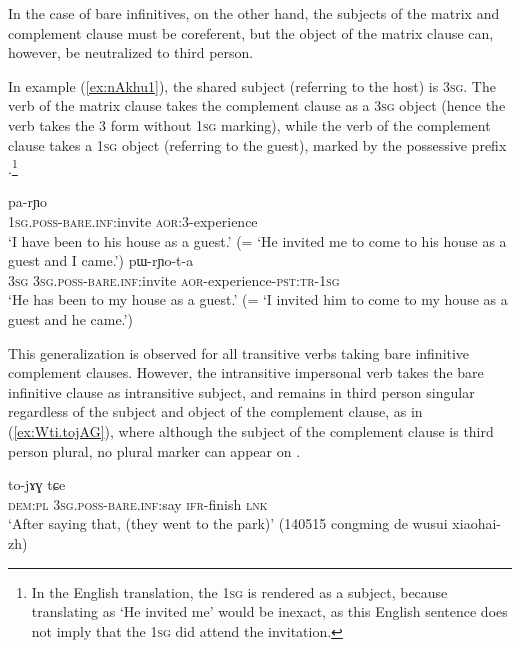 In the case of bare infinitives, on the other hand, the subjects of the matrix and complement clause must be coreferent, but the object of the matrix clause can, however, be neutralized to third person.

In example (\ref{ex:nAkhu1}), the shared subject (referring to the host) is \textsc{3sg}. The verb of the matrix clause takes the complement clause as a \textsc{3sg} object (hence the verb takes the 3\flobv{} form without \textsc{1sg} marking), while the verb of the complement clause takes a \textsc{1sg} object (referring to the guest), marked by the possessive prefix .\footnote{In the English translation, the \textsc{1sg} is rendered as a subject, because translating   as `He invited me' would be inexact, as this English sentence does not imply that the \textsc{1sg} did attend the invitation. }

\begin{exe}
\ex  \label{ex:nAkhu1}
\gll [a-nɤkʰu] pa-rɲo \\
\textsc{1sg}.\textsc{poss}-\textsc{bare}.\textsc{inf:}invite \textsc{aor}:3\flobv{}-experience \\
\glt `I have been to his house as a guest.' (= `He invited me to come to his house as a guest and I came.')
\ex  \label{ex:nAkhu2}
 pɯ-rɲo-t-a  \\
\textsc{3sg}  \textsc{3sg}.\textsc{poss}-\textsc{bare}.\textsc{inf}:invite \textsc{aor}-experience-\textsc{pst}:\textsc{tr}-\textsc{1sg} \\
\glt `He has been to my house as a guest.' (= `I invited him to come to my house as a guest and he came.')
\end{exe}

This generalization is observed for all transitive verbs taking bare infinitive complement clauses. However, the intransitive impersonal verb  takes the bare infinitive clause as intransitive subject, and remains in third person singular regardless of the subject and object of the complement clause, as in (\ref{ex:Wti.tojAG}), where although the subject of the complement clause is third person plural, no plural marker can appear on .

\begin{exe}
\ex \label{ex:Wti.tojAG}
\gll [nɯra ɯ-ti] to-jɤɣ tɕe \\
\textsc{dem}:\textsc{pl} \textsc{3sg}.\textsc{poss}-\textsc{bare}.\textsc{inf}:say \textsc{ifr}-finish \textsc{lnk}\\
\glt `After saying that, (they went to the park)' (140515 congming de wusui xiaohai-zh)
\end{exe}

